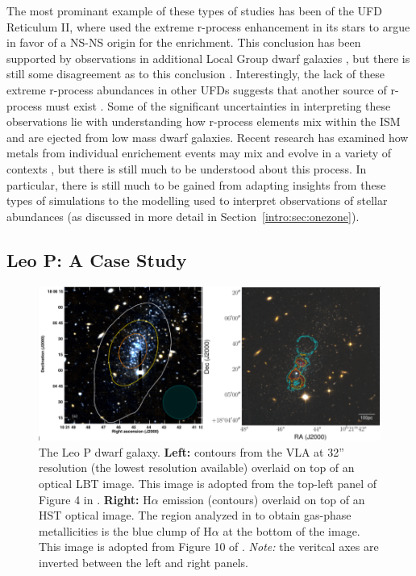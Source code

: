 The most prominant example of these types of studies has been of the UFD Reticulum II, where \cite{Ji2016} used the extreme r-process enhancement in its stars to argue in favor of a NS-NS origin for the enrichment. This conclusion has been supported by observations in additional Local Group dwarf galaxies \citep{Duggan2018}, but there is still some disagreement as to this conclusion \citep[e.g.][]{Siegel2018}. Interestingly, the lack of these extreme r-process abundances in other UFDs suggests that another source of r-process must exist \citep{Ji2016b}. Some of the significant uncertainties in interpreting these observations lie with understanding how r-process elements mix within the ISM and are ejected from low mass dwarf galaxies. Recent research has examined how metals from individual enrichement events may mix and evolve in a variety of contexts \citep[e.g.][]{Bland-Hawthorn2015,Ritter2015,Montes2016,Safarzadeh2017}, but there is still much to be understood about this process. In particular, there is still much to be gained from adapting insights from these types of simulations to the modelling used to interpret observations of stellar abundances (as discussed in more detail in Section~\ref{intro:sec:onezone}).

\subsection{Leo P: A Case Study}
\label{intro:sec:Leo P}

\begin{figure}
 \centering
 \includegraphics[width=0.975\linewidth]{figures/intro/Leo_P}
 \caption{The Leo P dwarf galaxy. \textbf{Left:} \hi contours from the VLA at 32'' resolution (the lowest resolution available) overlaid on top of an optical LBT image. This image is adopted from the top-left panel of Figure 4 in \cite{Bernstein-Cooper2014}. \textbf{Right:} H$\alpha$ emission (contours) overlaid on top of an HST optical image. The \hii region analyzed in \cite{McQuinn2015} to obtain gas-phase metallicities is the blue clump of H$\alpha$ at the bottom of the image. This image is adopted from Figure 10 of \cite{Evans2019}. \textit{Note:} the veritcal axes are inverted between the left and right panels.}
 \label{intro:fig:Leo P}
\end{figure}

